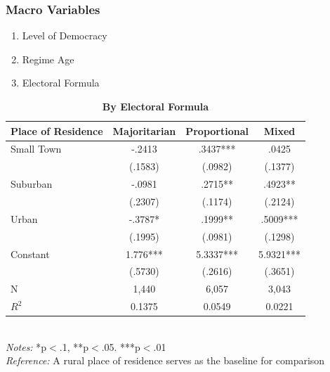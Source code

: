 \documentclass[20pt]{beamer}
\newcommand\e{\emph}
\newcommand\tb{\textbf}
\begin{document}
\begin{frame}
\frametitle{Macro Variables}
\begin{enumerate}
	\item Level of Democracy
	\item Regime Age
	\item Electoral Formula
\end{enumerate}	
\end{frame}

\begin{frame}
\tiny
\begin{table}[h!]
	\centering
	\caption{\tb{By Electoral Formula}}
	\begin{tabulary}{\linewidth}{l c c c}
		\\
		\hline
		\tb{Place of Residence}&\tb{Majoritarian}&\tb{Proportional} &\tb{Mixed} \\
		\hline
		Small Town&-.2413 &.3437*** &.0425 \\
		&(.1583)&(.0982) &(.1377) \\
		Suburban&-.0981 &.2715**&.4923**  \\
		&(.2307) &(.1174) &(.2124) \\
		Urban&-.3787* &.1999** &.5009*** \\
		&(.1995) &(.0981) &(.1298) \\
		Constant& 1.776*** &5.3337***&5.9321*** \\
		&(.5730) &(.2616) &(.3651) \\
		N&1,440&6,057 &3,043\\
		$R^2$&0.1375&0.0549&0.0221 \\
		\hline 
	\end{tabulary} 
	\\ 
	\e{Notes:} *p$<$.1, **p$<$.05. ***p$<$.01 \\
	\e{Reference:} A rural place of residence serves as the baseline for comparison
\end{table}
\end{frame}
\end{document}
